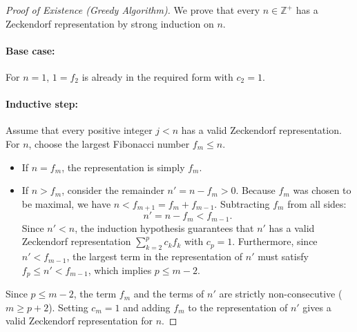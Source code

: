 \documentclass[a4paper]{article}
\begin{document}
\begin{proof}[Proof of Existence (Greedy Algorithm)]
We prove that every $n \in \mathbb{Z}^+$ has a Zeckendorf representation by strong induction on $n$.

\paragraph{Base case:} For $n = 1$, $1 = f_2$ is already in the required form with $c_2 = 1$.

\paragraph{Inductive step:} Assume that every positive integer $j < n$ has a valid Zeckendorf representation. For $n$, choose the largest Fibonacci number $f_m \leq n$. 
\begin{itemize}[leftmargin=*]
\item If $n = f_m$, the representation is simply $f_m$.
\item If $n > f_m$, consider the remainder $n' = n - f_m > 0$. Because $f_m$ was chosen to be maximal, we have $n < f_{m+1} = f_m + f_{m-1}$. Subtracting $f_m$ from all sides:
\begin{equation*}
n' = n - f_m < f_{m-1}.
\end{equation*}
Since $n' < n$, the induction hypothesis guarantees that $n'$ has a valid Zeckendorf representation $\sum_{k=2}^{p} c_k f_k$ with $c_p = 1$. Furthermore, since $n' < f_{m-1}$, the largest term in the representation of $n'$ must satisfy $f_p \leq n' < f_{m-1}$, which implies $p \leq m - 2$.
\end{itemize}
Since $p \leq m - 2$, the term $f_m$ and the terms of $n'$ are strictly non-consecutive ($m \geq p + 2$). Setting $c_m = 1$ and adding $f_m$ to the representation of $n'$ gives a valid Zeckendorf representation for $n$.
\end{proof}
\end{document}
